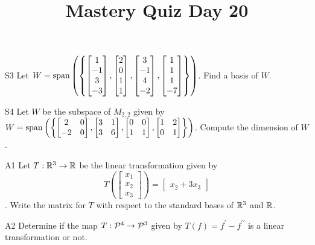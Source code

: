 \documentclass{sbgLAquiz}
\title{Mastery Quiz Day 20 }
\begin{document}
\begin{problem}{S3}
Let $W={\rm span}\left( \left\{ \begin{bmatrix} 1 \\ -1 \\ 3 \\ -3 \end{bmatrix},\begin{bmatrix} 2 \\ 0 \\ 1 \\ 1 \end{bmatrix}, \begin{bmatrix} 3 \\ -1 \\ 4 \\ -2 \end{bmatrix},  \begin{bmatrix} 1 \\ 1 \\ 1 \\ -7 \end{bmatrix} \right\}\right)$.  Find a basis of $W$.
\end{problem}

\begin{problem}{S4}
Let $W$ be the subspace of $M_{2,2}$ given by $W={\rm span}\left(\left\{\begin{bmatrix} 2 & 0 \\ -2 & 0 \end{bmatrix}, \begin{bmatrix} 3 & 1 \\ 3 & 6 \end{bmatrix}, \begin{bmatrix} 0 & 0 \\ 1 & 1 \end{bmatrix}, \begin{bmatrix}1 & 2 \\ 0 & 1 \end{bmatrix}\right\}\right)$. Compute the dimension of $W$.
\end{problem}
\newpage

\begin{problem}{A1}
Let $T: \IR^3 \rightarrow \IR$ be the linear transformation given by $$T\left(\begin{bmatrix} x_1 \\ x_2 \\ x_3  \end{bmatrix} \right) = \begin{bmatrix} x_2+3x_3 \end{bmatrix}$$. Write the matrix for $T$ with respect to the standard bases of $\IR^3$ and $\IR$.
\end{problem}

\begin{problem}{A2}
Determine if the map $T: \P ^4 \rightarrow \P^3$ given by $T(f) = f^{\prime}-f^{\prime \prime}$ is a linear transformation or not.
\end{problem}
\end{document}
